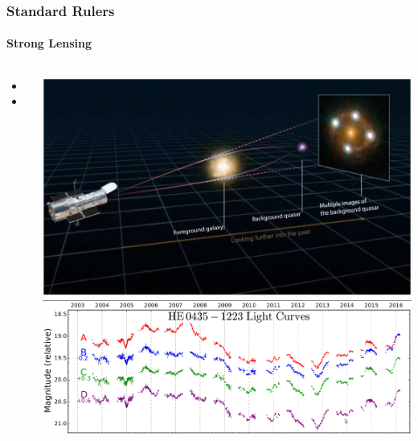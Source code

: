 \documentclass[aspectratio=169]{beamer}
\begin{document}
\begin{frame}
    \frametitle{Standard Rulers}
    \framesubtitle{Strong Lensing}
    \begin{columns}
        \begin{itemize}
            \item <+Explanation+>
            \item <+Planck+>
        \end{itemize}
        \includegraphics[width=\textwidth]{figures/time_delay.jpg}
        \includegraphics[width=\textwidth]{figures/time_delay_curve.png}%
    \end{columns}
\end{frame}
\end{document}
